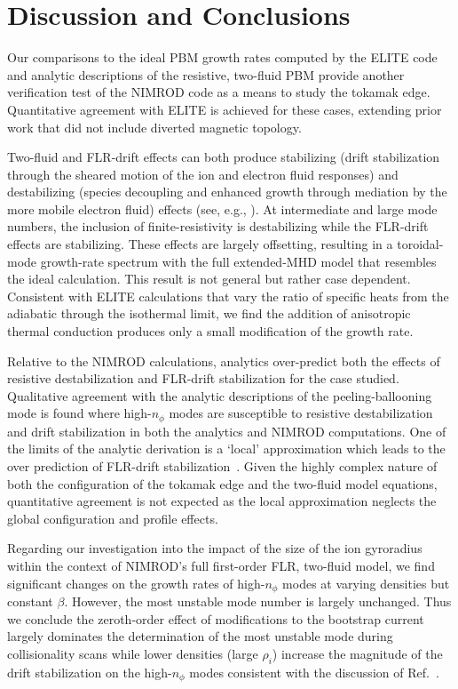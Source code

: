 \section{Discussion and Conclusions} 
\label{sec:conclusions}

Our comparisons to the ideal PBM growth rates computed by the ELITE code and
analytic descriptions of the resistive, two-fluid PBM provide another
verification test of the NIMROD code as a means to study the tokamak edge.
Quantitative agreement with ELITE is achieved for these cases, extending prior
work \cite{Burke10} that did not include diverted magnetic topology.

Two-fluid and FLR-drift effects can both produce stabilizing (drift
stabilization through the sheared motion of the ion and electron fluid
responses) and destabilizing (species decoupling and enhanced growth
through mediation by the more mobile electron fluid) effects (see, e.g.,
\cite{King11,King14}).  At intermediate and large mode numbers, the
inclusion of finite-resistivity is destabilizing while the FLR-drift
effects are stabilizing. These effects are largely offsetting, resulting
in a toroidal-mode growth-rate spectrum with the full extended-MHD model
that resembles the ideal calculation. This result is not general but
rather case dependent.  Consistent with ELITE calculations that vary the
ratio of specific heats from the adiabatic through the isothermal limit, we
find the addition of anisotropic thermal conduction produces only a
small modification of the growth rate.

Relative to the NIMROD calculations, analytics \cite{Hastie03} over-predict
both the effects of resistive destabilization and FLR-drift stabilization for
the case studied. Qualitative agreement with the analytic descriptions of the
peeling-ballooning mode is found where high-$n_\phi$ modes are susceptible to
resistive destabilization and drift stabilization in both the analytics and
NIMROD computations.  One of the limits of the analytic derivation is a `local'
approximation which leads to the over prediction of FLR-drift
stabilization~\cite{Hastie00}.  Given the highly complex nature of both the
configuration of the tokamak edge and the two-fluid model equations,
quantitative agreement is not expected as the local approximation neglects the
global configuration and profile effects.

Regarding our investigation into the impact of the size of the ion gyroradius within the
context of NIMROD's full first-order FLR, two-fluid model, we find significant
changes on the growth rates of high-$n_\phi$ modes at varying densities but
constant $\beta$. However, the most unstable mode number is largely unchanged.
Thus we conclude the zeroth-order effect of modifications to the bootstrap
current largely dominates the determination of the most unstable mode during
collisionality scans while lower densities (large $\rho_i$) increase the
magnitude of the drift stabilization on the high-$n_\phi$ modes consistent
with the discussion of Ref.~\cite{Snyder07}. 

